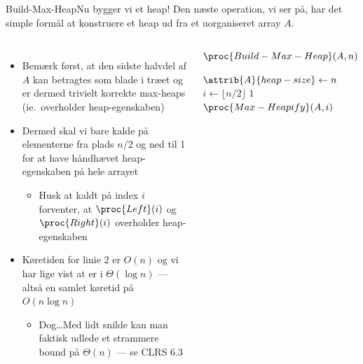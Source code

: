 \documentclass[aspectratio=1610]{beamer}
\begin{document}
\begin{frame}{Build-Max-Heap}{Nu bygger vi et heap!}
    Den næste operation, vi ser på, har det simple formål at konstruere et heap
    ud fra et uorganiseret array $A$.

    \begin{columns}
        \begin{itemize}[<+->]
            \small
            \item Bemærk først, at den sidste halvdel af $A$ kan betragtes som
                blade i træet og er dermed trivielt korrekte max-heaps (ie.\
                overholder heap-egenskaben)
            \item Dermed skal vi bare kalde  på elementerne
                fra plads $n/2$ og ned til 1 for at have håndhævet
                heap-egenskaben på hele arrayet
                \begin{itemize}
                    \item Husk at  kaldt på index $i$
                        forventer, at $\proc{Left}(i)$ og $\proc{Right}(i)$
                        overholder heap-egenskaben
                \end{itemize}
            \item Køretiden for linie 2 er $O(n)$ og vi har lige vist at
                \proc{Max-Hepify} er i $\Theta(\log n)$ --- altså en samlet
                køretid på $O(n \log n)$
                \begin{itemize}
                    \item Dog\ldots Med lidt snilde kan man faktisk udlede et
                        strammere bound på \alert{$\Theta(n)$} --- se CLRS 6.3
                \end{itemize}
        \end{itemize}
    
        \begin{block}{$\proc{Build-Max-Heap}(A,n)$}

            \vspace{-\abovedisplayskip}
            \begin{codebox}
                \li $\attrib{A}{heap-size} \gets n$
                \li \For $i \gets \lfloor n/2 \rfloor$ \Downto $1$ 
                \li     \Do
                            $\proc{Max-Heapify}(A,i)$
                        \End
            \end{codebox}
        \end{block}
    \end{columns}
\end{frame}
\end{document}
